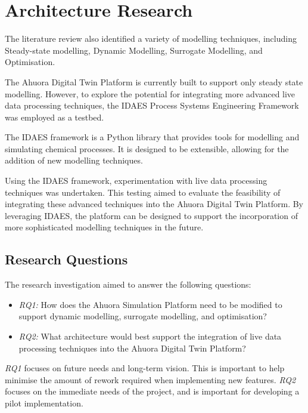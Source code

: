 
\chapter{Architecture Research} \label{sec:architectureresearch}

The literature review also identified a variety of modelling techniques, including Steady-state modelling, Dynamic Modelling, Surrogate Modelling, and Optimisation. 

The Ahuora Digital Twin Platform is currently built to support only steady state modelling. However, to explore the potential for integrating more advanced live data processing techniques, the IDAES Process Systems Engineering Framework was employed as a testbed.

The IDAES framework is a Python library that provides tools for modelling and simulating chemical processes. It is designed to be extensible, allowing for the addition of new modelling techniques.

Using the IDAES framework, experimentation with live data processing techniques was undertaken. This testing aimed to evaluate the feasibility of integrating these advanced techniques into the Ahuora Digital Twin Platform. By leveraging IDAES, the platform can be designed to support the incorporation of more sophisticated modelling techniques in the future.

\section{Research Questions}

The research investigation aimed to answer the following questions:

\begin{itemize}
    \item \textit{RQ1:} How does the Ahuora Simulation Platform need to be modified to support dynamic modelling, surrogate modelling, and optimisation?
    \item \textit{RQ2:} What architecture would best support the integration of live data processing techniques into the Ahuora Digital Twin Platform?
\end{itemize}

\textit{RQ1} focuses on future needs and long-term vision. This is important to help minimise the amount of rework required when implementing new features. \textit{RQ2} focuses on the immediate needs of the project, and is important for developing a pilot implementation.


